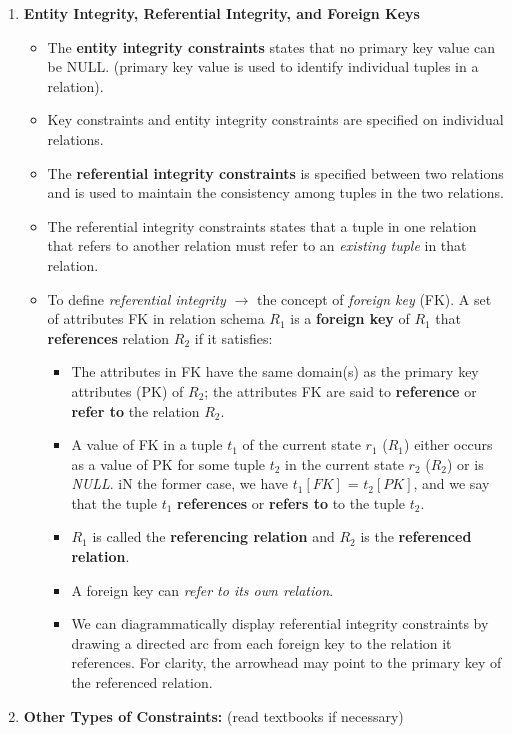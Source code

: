 \documentclass[10pt]{article}
\begin{document}
\begin{enumerate}
	\item \textbf{Entity Integrity, Referential Integrity, and Foreign Keys}
	\begin{itemize}
		\item The \textbf{entity integrity constraints} states that no primary key value can be NULL. (primary key value is used to identify individual tuples in a relation).
		\item Key constraints and entity integrity constraints are specified on individual relations.
		\item The \textbf{referential integrity constraints} is specified between two relations and is used to maintain the consistency among tuples in the two relations.
		\item The referential integrity constraints states that a tuple in one relation that refers to another relation must refer to an \textit{existing tuple} in that relation.
		\item To define \textit{referential integrity} $\rightarrow$ the concept of \textit{foreign key} (FK). A set of attributes FK in relation schema $R_1$ is a \textbf{foreign key} of $R_1$ that \textbf{references} relation $R_2$ if it satisfies:
		\begin{itemize}
			\item The attributes in FK have the same domain(s) as the primary key attributes (PK) of $R_2$; the attributes FK are said to \textbf{reference} or \textbf{refer to} the relation $R_2$.
			\item A value of FK in a tuple $t_1$ of the current state $r_1$ ($R_1$) either occurs as a value of PK for some tuple $t_2$ in the current state $r_2$ ($R_2$) or is \textit{NULL}. iN the former case, we have $t_1[FK]$ = $t_2[PK]$, and we say that the tuple $t_1$ \textbf{references} or \textbf{refers to} to the tuple $t_2$.
			\item $R_1$ is called the \textbf{referencing relation} and $R_2$ is the \textbf{referenced relation}.
			\item A foreign key can \textit{refer to its own relation}.
			\item We can diagrammatically display referential integrity constraints by drawing a directed arc from each foreign key to the relation it references. For clarity, the arrowhead may point to the primary key of the referenced relation.
		\end{itemize}   
	\end{itemize}

	\item \textbf{Other Types of Constraints: }
	(read textbooks if necessary)
\end{enumerate}
\end{document}
